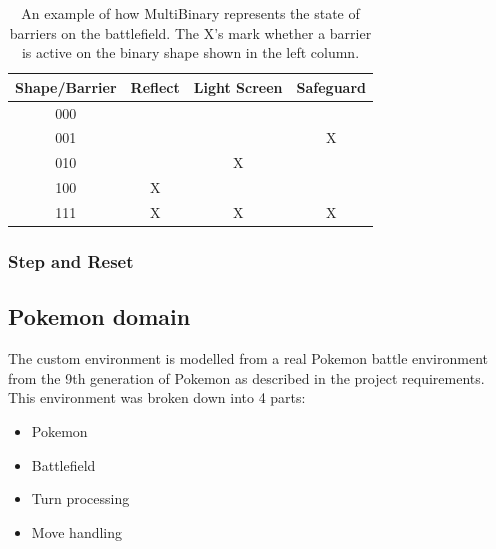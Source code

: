 \begin{table}[h]
    \centering
    \begin{tabular}{|c|c|c|c|}
        \hline
        Shape/Barrier & Reflect & Light Screen & Safeguard \\\hline
        000           &         &              &           \\\hline
        001           &         &              & X         \\\hline
        010           &         & X            &           \\\hline
        100           & X       &              &           \\\hline
        111           & X       & X            & X         \\\hline
    \end{tabular}
    \label{tab:multibinary-barrier-example}
    \caption{An example of how MultiBinary represents the state of barriers on the battlefield. The X's mark whether a
        barrier is active on the binary shape shown in the left column.}
\end{table}

\subsubsection{Step and Reset}

\subsection{Pokemon domain}
\label{subsec:pokemon-domain}
The custom environment is modelled from a real Pokemon battle environment from the 9th generation of Pokemon as described in the project requirements.
This environment was broken down into 4 parts:
\begin{itemize}
    \item Pokemon
    \item Battlefield
    \item Turn processing
    \item Move handling
\end{itemize}

